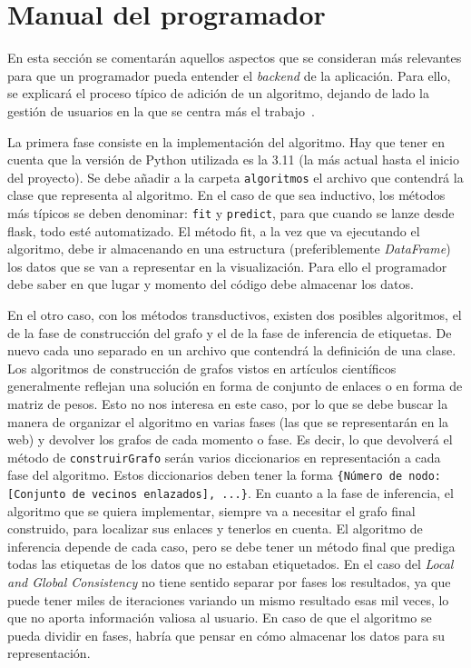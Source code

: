 \section{Manual del programador}
En esta sección se comentarán aquellos aspectos que se consideran más relevantes para que un programador pueda entender el \textit{backend} de la aplicación. Para ello, se explicará el proceso típico de adición de un algoritmo, dejando de lado la gestión de usuarios en la que se centra más el trabajo~\cite{TFG:David}. 

La primera fase consiste en la implementación del algoritmo. Hay que tener en cuenta que la versión de Python utilizada es la 3.11 (la más actual hasta el inicio del proyecto). Se debe añadir a la carpeta \texttt{algoritmos} el archivo que contendrá la clase que representa al algoritmo. En el caso de que sea inductivo, los métodos más típicos se deben denominar: \texttt{fit} y \texttt{predict}, para que cuando se lanze desde flask, todo esté automatizado. El método fit, a la vez que va ejecutando el algoritmo, debe ir almacenando en una estructura (preferiblemente \textit{DataFrame}) los datos que se van a representar en la visualización. Para ello el programador debe saber en que lugar y momento del código debe almacenar los datos.

En el otro caso, con los métodos transductivos, existen dos posibles algoritmos, el de la fase de construcción del grafo y el de la fase de inferencia de etiquetas. De nuevo cada uno separado en un archivo que contendrá la definición de una clase. Los algoritmos de construcción de grafos vistos en artículos científicos generalmente reflejan una solución en forma de conjunto de enlaces o en forma de matriz de pesos. Esto no nos interesa en este caso, por lo que se debe buscar la manera de organizar el algoritmo en varias fases (las que se representarán en la web) y devolver los grafos de cada momento o fase. Es decir, lo que devolverá el método de \texttt{construirGrafo} serán varios diccionarios en representación a cada fase del algoritmo. Estos diccionarios deben tener la forma \texttt{\{Número de nodo: [Conjunto de vecinos enlazados], ...\}}. En cuanto a la fase de inferencia, el algoritmo que se quiera implementar, siempre va a necesitar el grafo final construido, para localizar sus enlaces y tenerlos en cuenta. El algoritmo de inferencia depende de cada caso, pero se debe tener un método final que prediga todas las etiquetas de los datos que no estaban etiquetados. En el caso del \textit{Local and Global Consistency} no tiene sentido separar por fases los resultados, ya que puede tener miles de iteraciones variando un mismo resultado esas mil veces, lo que no aporta información valiosa al usuario. En caso de que el algoritmo se pueda dividir en fases, habría que pensar en cómo almacenar los datos para su representación.

